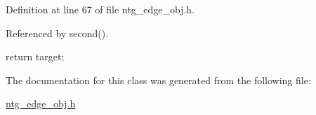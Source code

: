 Definition at line 67 of file ntg\_\-edge\_\-obj.h.



Referenced by second().




\begin{DoxyCode}
{ return target;}
\end{DoxyCode}




The documentation for this class was generated from the following file:\begin{DoxyCompactItemize}
\item 
\hyperlink{ntg__edge__obj_8h}{ntg\_\-edge\_\-obj.h}\end{DoxyCompactItemize}
